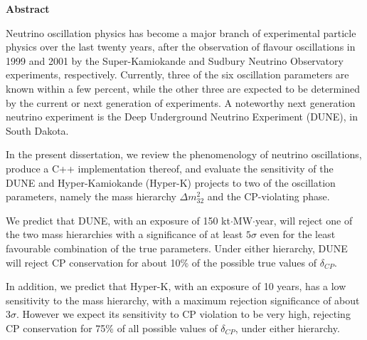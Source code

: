 \begin{center}

\vspace*{2cm} %
        
{\large\textbf{Abstract}}
        
\vspace{1cm} %
\end{center}

Neutrino oscillation physics has become a major branch of experimental particle
physics over the last twenty years, after the observation of flavour
oscillations in 1999 and 2001 by the Super-Kamiokande and Sudbury Neutrino
Observatory experiments, respectively. Currently, three of the six oscillation
parameters are known within a few percent, while the other three are expected
to be determined by the current or next generation of experiments.
A noteworthy next generation neutrino experiment is the Deep Underground
Neutrino Experiment (DUNE), in South Dakota. 

In the present dissertation, we review
the phenomenology of neutrino oscillations, produce a C++ implementation
thereof, and evaluate the sensitivity of the DUNE and Hyper-Kamiokande
(Hyper-K) projects to two of the oscillation parameters, namely the mass
hierarchy $\Delta m^2_{32}$ and the CP-violating phase.

We predict that DUNE, with an exposure of 150 kt$\cdot$MW$\cdot$year, will
reject one of the two mass hierarchies with a significance of at least
$5\sigma$ even for the least favourable combination of the true parameters.
Under either hierarchy, DUNE will reject CP conservation for about 10\% of
the possible true values of $\delta_{CP}$.

In addition, we predict that Hyper-K, with an exposure of 10 years, has a low
sensitivity to the mass hierarchy, with a maximum rejection significance of
about $3\sigma$. 
However we expect its sensitivity to CP violation to be very high, rejecting CP
conservation for 75\% of all possible values of $\delta_{CP}$, under either
hierarchy.



